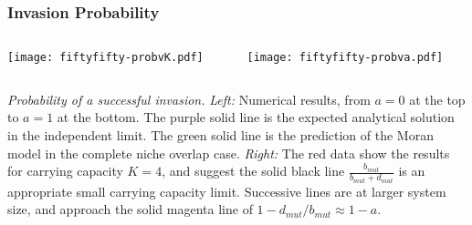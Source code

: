 \documentclass[dvipsnames]{beamer}
\begin{document}
\begin{frame}
\frametitle{Invasion Probability}
\begin{columns}
	\begin{column}{5.5cm}
		\begin{center}
			\texttt{[image: fiftyfifty-probvK.pdf]}
		\end{center}
	\end{column}
	\begin{column}{5.5cm}
		\begin{center}
			\texttt{[image: fiftyfifty-probva.pdf]}
		\end{center}
	\end{column}
\end{columns}
\justifying
\footnotesize{
	\emph{Probability of a successful invasion.}
	\emph{Left:} Numerical results, from $a=0$ at the top to $a=1$ at the bottom. The purple solid line is the expected analytical solution in the independent limit. The green solid line is the prediction of the Moran model in the complete niche overlap case. 
	\emph{Right:} The red data show the results for carrying capacity $K=4$, and suggest the solid black line $\frac{b_{mut}}{b_{mut}+d_{mut}}$ is an appropriate small carrying capacity limit. Successive lines are at larger system size, and approach the solid magenta line of $1-d_{mut}/b_{mut}\approx 1-a$.
}
\end{frame}
\end{document}
